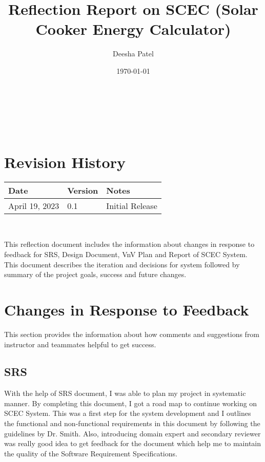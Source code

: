 \documentclass{article}
\begin{document}
\title{Reflection Report on SCEC (Solar Cooker Energy Calculator)}

\author{Deesha Patel}

\date{\today}

\maketitle

~\newpage

\tableofcontents

~\newpage

\section*{Revision History}

\begin{tabularx}{\textwidth}{p{3cm}p{2cm}X}
\toprule {\bf Date} & {\bf Version} & {\bf Notes}\\
\midrule
April 19, 2023 & 0.1 & Initial Release\\
\bottomrule
\end{tabularx}

~\newpage

\maketitle

This reflection document includes the information about changes in response to feedback for SRS, Design Document, VnV Plan and Report of SCEC System. This document describes the iteration and decisions for system followed by summary of the project goals, success and future changes.    

\section{Changes in Response to Feedback}

This section provides the information about how comments and suggestions from instructor and teammates helpful to get success. 

\subsection{SRS}

With the help of SRS document, I was able to plan my project in systematic manner. By completing this document, I got a road map to continue working on SCEC System. This was a first step for the system development and I outlines the functional and non-functional requirements in this document by following the guidelines by Dr. Smith. Also, introducing domain expert and secondary reviewer was really good idea to get feedback for the document which help me to maintain the quality of the Software Requirement Specifications. 
\end{document}
